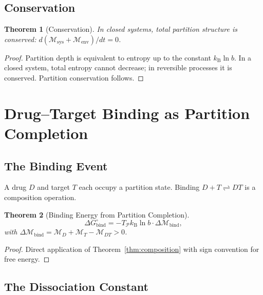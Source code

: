 \documentclass[twocolumn,10pt,a4paper]{article}
\newtheorem{theorem}{Theorem}[section]
\theoremstyle{definition}
\theoremstyle{remark}
\newcommand{\kB}{k_{\mathrm{B}}}
\newcommand{\Depth}{\mathcal{M}}
\newcommand{\Partition}{\mathcal{P}}
\begin{document}
\subsection{Conservation}

\begin{theorem}[Conservation]
In closed systems, total partition structure is conserved: $d(\Depth_{\mathrm{sys}} + \Depth_{\mathrm{env}})/dt = 0$.
\end{theorem}

\begin{proof}
Partition depth is equivalent to entropy up to the constant $\kB\ln b$. In a closed system, total entropy cannot decrease; in reversible processes it is conserved. Partition conservation follows.
\end{proof}

\section{Drug--Target Binding as Partition Completion}

\subsection{The Binding Event}

A drug $D$ and target $T$ each occupy a partition state. Binding $D + T \rightleftharpoons DT$ is a composition operation.

\begin{theorem}[Binding Energy from Partition Completion]
\label{thm:binding}
\begin{equation}
    \Delta G^\circ_{\mathrm{bind}} = -T_\Partition \kB \ln b \cdot \Delta\Depth_{\mathrm{bind}},
\end{equation}
with $\Delta\Depth_{\mathrm{bind}} = \Depth_D + \Depth_T - \Depth_{DT} > 0$.
\end{theorem}

\begin{proof}
Direct application of Theorem~\ref{thm:composition} with sign convention for free energy.
\end{proof}

\subsection{The Dissociation Constant}
\end{document}
